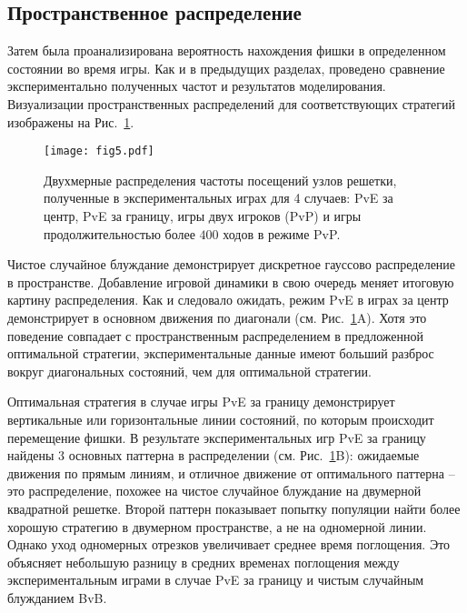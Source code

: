 \subsection{Пространственное распределение}\label{subsec:ch3/sec4/sub4}

Затем была проанализирована вероятность нахождения фишки в определенном состоянии во время игры. Как и в предыдущих разделах, проведено сравнение экспериментально полученных частот и результатов моделирования. Визуализации пространственных распределений для соответствующих стратегий изображены на Рис.~\cref{fig:distribution_states}.

\begin{figure}[t]
    \centering
    \texttt{[image: fig5.pdf]}
    \caption{
        Двухмерные распределения частоты посещений узлов решетки, полученные в экспериментальных играх для 4 случаев: 
        PvE за центр, PvE за границу, игры двух игроков (PvP) и игры продолжительностью более $400$ ходов в режиме PvP.
    }  
    \label{fig:distribution_states}
    
\end{figure}

Чистое случайное блуждание демонстрирует дискретное гауссово распределение в пространстве. Добавление игровой динамики в свою очередь меняет итоговую картину распределения. Как и следовало ожидать, режим PvE в играх за центр демонстрирует в основном движения по диагонали (см. Рис.~\cref{fig:distribution_states}A). Хотя это поведение совпадает с пространственным распределением в предложенной оптимальной стратегии, экспериментальные данные имеют больший разброс вокруг диагональных состояний, чем для оптимальной стратегии.

Оптимальная стратегия в случае игры PvE за границу демонстрирует вертикальные или горизонтальные линии состояний, по которым происходит перемещение фишки. В результате экспериментальных игр PvE за границу найдены 3 основных паттерна в распределении (см. Рис.~\cref{fig:distribution_states}B): ожидаемые движения по прямым линиям, и отличное движение от оптимального паттерна -- это распределение, похожее на чистое случайное блуждание на двумерной квадратной решетке. Второй паттерн показывает попытку популяции найти более хорошую стратегию в двумерном пространстве, а не на одномерной линии. Однако уход одномерных отрезков увеличивает среднее время поглощения. Это объясняет небольшую разницу в средних временах поглощения между экспериментальным играми в случае PvE за границу и чистым случайным блужданием BvB.

